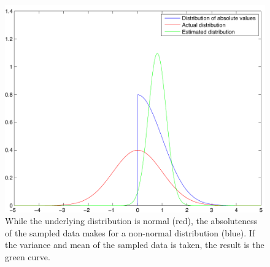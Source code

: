 \begin{figure}[htbp]
	\centering
		\includegraphics[width=\textwidth]{img/absdistrib.pdf}
	\caption{While the underlying distribution is normal (red), the absoluteness of the sampled data makes for a non-normal distribution (blue). If the variance and mean of the sampled data is taken, the result is the green curve.}
	\label{fig:absdistrib}
\end{figure}